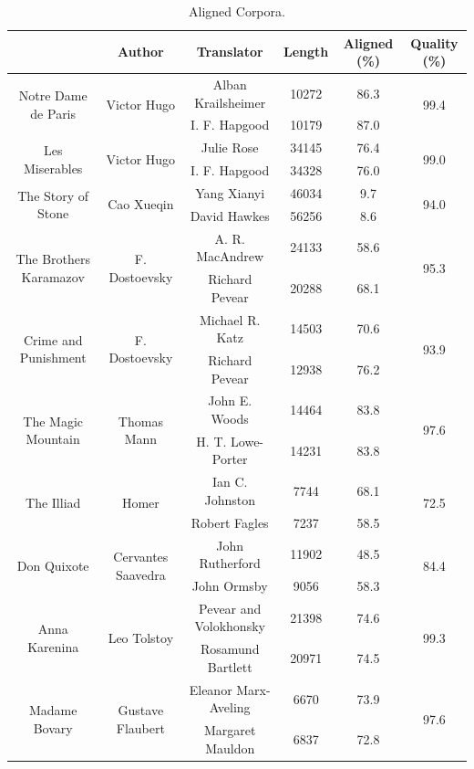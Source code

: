 \documentclass[runningheads]{llncs}
\begin{document}
\begin{table}[h!]\footnotesize
	\centering
	\small
	\caption{Aligned Corpora.}\label{tb:6}
	\begin{tabular}{|c|c|c|c|c|c|}
		\hline
		\textbf{\diagbox{Corpus}{Information}} & \textbf{Author} & \textbf{Translator} & \textbf{Length} & \textbf{Aligned (\%)} & \textbf{Quality (\%)} \\
		\hline
		\hline
		\multirow{2}{*}{Notre Dame de Paris} & \multirow{2}{*}{Victor Hugo} & Alban Krailsheimer & 10272 & 86.3 & \multirow{2}{*}{99.4} \\
		\cline{3-5} 
		& & I. F. Hapgood & 10179 & 87.0 & \\
		\hline
		\multirow{2}{*}{Les Miserables} & \multirow{2}{*}{Victor Hugo} & Julie Rose & 34145 & 76.4 & \multirow{2}{*}{99.0} \\
		\cline{3-5}
		& & I. F. Hapgood & 34328 & 76.0 & \\
		\hline
		\multirow{2}{*}{The Story of Stone} & \multirow{2}{*}{Cao Xueqin} & Yang Xianyi & 46034 & 9.7 & \multirow{2}{*}{94.0} \\
		\cline{3-5}
		& & David Hawkes & 56256 & 8.6 &  \\
		\hline
		\multirow{2}{*}{The Brothers Karamazov} & \multirow{2}{*}{F. Dostoevsky} & A. R. MacAndrew & 24133 & 58.6 & \multirow{2}{*}{95.3} \\
		\cline{3-5}
		& & Richard Pevear & 20288 & 68.1 & \\
		\hline
		\multirow{2}{*}{Crime and Punishment} & \multirow{2}{*}{F. Dostoevsky} & Michael R. Katz & 14503 & 70.6 & \multirow{2}{*}{93.9} \\
		\cline{3-5}
		& & Richard Pevear & 12938 & 76.2 & \\
		\hline
		\multirow{2}{*}{The Magic Mountain} & \multirow{2}{*}{Thomas Mann} & John E. Woods & 14464 & 83.8 & \multirow{2}{*}{97.6} \\
		\cline{3-5}
		& & H. T. Lowe-Porter & 14231 & 83.8 & \\
		\hline
		\multirow{2}{*}{The Illiad} & \multirow{2}{*}{Homer} & Ian C. Johnston & 7744 & 68.1 & \multirow{2}{*}{72.5} \\
		\cline{3-5}
		& & Robert Fagles & 7237 & 58.5 & \\
		\hline
		\multirow{2}{*}{Don Quixote} & \multirow{2}{*}{Cervantes Saavedra} & John Rutherford & 11902 & 48.5 & \multirow{2}{*}{84.4} \\
		\cline{3-5}
		& & John Ormsby & 9056 & 58.3 & \\
		\hline
		\multirow{2}{*}{Anna Karenina} & \multirow{2}{*}{Leo Tolstoy} & Pevear and Volokhonsky & 21398 & 74.6 & \multirow{2}{*}{99.3} \\
		\cline{3-5}
		& & Rosamund Bartlett & 20971 & 74.5 & \\
		\hline
		\multirow{2}{*}{Madame Bovary} & \multirow{2}{*}{Gustave Flaubert} & Eleanor Marx-Aveling & 6670 & 73.9 & \multirow{2}{*}{97.6} \\
		\cline{3-5}
		& & Margaret Mauldon & 6837 & 72.8 & \\
		\hline
	\end{tabular}
\end{table}
\end{document}
